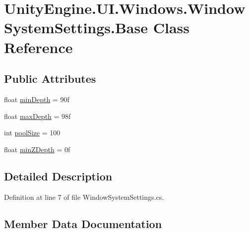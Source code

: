 \hypertarget{class_unity_engine_1_1_u_i_1_1_windows_1_1_window_system_settings_1_1_base}{}\section{Unity\+Engine.\+U\+I.\+Windows.\+Window\+System\+Settings.\+Base Class Reference}
\label{class_unity_engine_1_1_u_i_1_1_windows_1_1_window_system_settings_1_1_base}
\subsection*{Public Attributes}
\begin{DoxyCompactItemize}
\item 
float \hyperlink{class_unity_engine_1_1_u_i_1_1_windows_1_1_window_system_settings_1_1_base_ab9c0a30f118087b034107e0d01e2e9b4}{min\+Depth} = 90f
\item 
float \hyperlink{class_unity_engine_1_1_u_i_1_1_windows_1_1_window_system_settings_1_1_base_a36f7cfd1fe92597bb44d35089fad7865}{max\+Depth} = 98f
\item 
int \hyperlink{class_unity_engine_1_1_u_i_1_1_windows_1_1_window_system_settings_1_1_base_a9714f9dd6ed7f94c42fc3d3d55622170}{pool\+Size} = 100
\item 
float \hyperlink{class_unity_engine_1_1_u_i_1_1_windows_1_1_window_system_settings_1_1_base_a53ef951cae971389afdb0125179a3375}{min\+Z\+Depth} = 0f
\end{DoxyCompactItemize}


\subsection{Detailed Description}


Definition at line 7 of file Window\+System\+Settings.\+cs.



\subsection{Member Data Documentation}
\hypertarget{class_unity_engine_1_1_u_i_1_1_windows_1_1_window_system_settings_1_1_base_a36f7cfd1fe92597bb44d35089fad7865}{}

